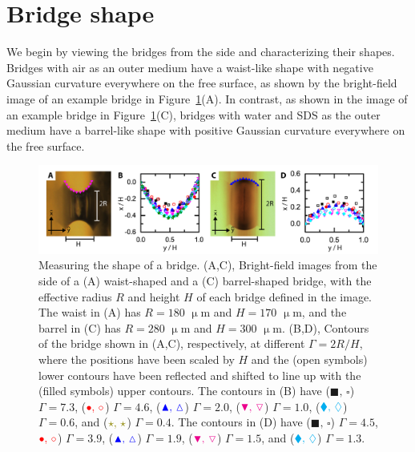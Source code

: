 \section{Bridge shape}
We begin by viewing the bridges from the side and characterizing their shapes.
Bridges with air as an outer medium have a waist-like shape with negative Gaussian curvature everywhere on the free surface, as shown by the bright-field image of an example bridge in Figure~\ref{f:5-ShapeContour}(A).
In contrast, as shown in the image of an example bridge in Figure~\ref{f:5-ShapeContour}(C), bridges with water and SDS as the outer medium have a barrel-like shape with positive Gaussian curvature everywhere on the free surface.
\begin{figure}
  \centering
  \includegraphics{figures/C5/Ch5-Figs_ShapeContour.png}
  \caption{Measuring the shape of a bridge.
  (A,C), Bright-field images from the side of a (A) waist-shaped and a (C) barrel-shaped bridge, with the effective radius $R$ and height $H$ of each bridge defined in the image.
  The waist in (A) has $R = 180$ $\upmu$m and $H = 170$ $\upmu$m, and the barrel in (C) has $R = 280$ $\upmu$m and $H = 300$ $\upmu$m.
  (B,D), Contours of the bridge shown in (A,C), respectively, at different $\Gamma = 2R/H$, where the positions have been scaled by $H$ and the (open symbols) lower contours have been reflected and shifted to line up with the (filled symbols) upper contours.
  The contours in (B) have (${\blacksquare,\, \square}$) $\Gamma = 7.3$,
   (${\color{red} \bullet,\, \circ}$) $\Gamma = 4.6$,
   (${\color{blue} \blacktriangle,\, \vartriangle}$) $\Gamma = 2.0$,
   (${\color{magenta} \blacktriangledown,\, \triangledown}$) $\Gamma = 1.0$,
   (${\color{cyan} \blacklozenge,\, \lozenge}$) $\Gamma = 0.6$, and
   (${\color{olive} \star,\, \star}$) $\Gamma = 0.4$.
  The contours in (D) have (${\blacksquare,\, \square}$) $\Gamma = 4.5$,
  ${\color{red} \bullet,\, \circ}$) $\Gamma = 3.9$,
  (${\color{blue} \blacktriangle,\, \vartriangle}$) $\Gamma = 1.9$,
  (${\color{magenta} \blacktriangledown,\, \triangledown}$) $\Gamma = 1.5$, and
  (${\color{cyan} \blacklozenge,\, \lozenge}$) $\Gamma = 1.3$.}\label{f:5-ShapeContour}
\end{figure}


